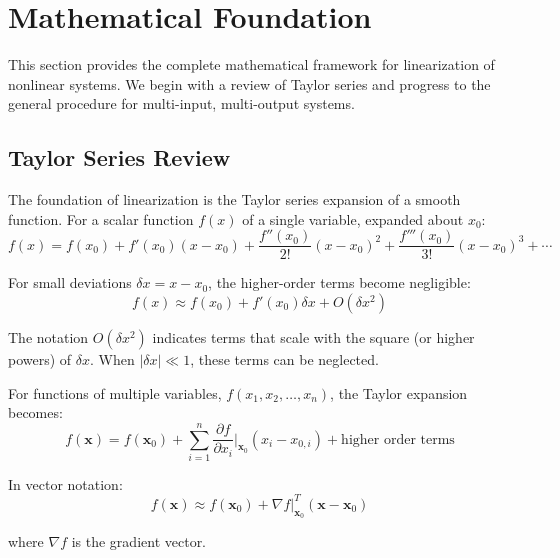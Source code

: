 \section{Mathematical Foundation}
\label{sec:linearization_math}

This section provides the complete mathematical framework for linearization of nonlinear systems. We begin with a review of Taylor series and progress to the general procedure for multi-input, multi-output systems.

\subsection{Taylor Series Review}

The foundation of linearization is the Taylor series expansion of a smooth function. For a scalar function $f(x)$ of a single variable, expanded about $x_0$:
\begin{equation}
f(x) = f(x_0) + f'(x_0)(x - x_0) + \frac{f''(x_0)}{2!}(x - x_0)^2 + \frac{f'''(x_0)}{3!}(x - x_0)^3 + \cdots
\label{eq:taylor_scalar}
\end{equation}

For small deviations $\delta x = x - x_0$, the higher-order terms become negligible:
\begin{equation}
f(x) \approx f(x_0) + f'(x_0)\delta x + O(\delta x^2)
\end{equation}

The notation $O(\delta x^2)$ indicates terms that scale with the square (or higher powers) of $\delta x$. When $|\delta x| \ll 1$, these terms can be neglected.

For functions of multiple variables, $f(x_1, x_2, \ldots, x_n)$, the Taylor expansion becomes:
\begin{equation}
f(\mathbf{x}) = f(\mathbf{x}_0) + \sum_{i=1}^{n} \frac{\partial f}{\partial x_i}\bigg|_{\mathbf{x}_0} (x_i - x_{0,i}) + \text{higher order terms}
\end{equation}

In vector notation:
\begin{equation}
f(\mathbf{x}) \approx f(\mathbf{x}_0) + \nabla f|_{\mathbf{x}_0}^T (\mathbf{x} - \mathbf{x}_0)
\end{equation}

where $\nabla f$ is the gradient vector.

